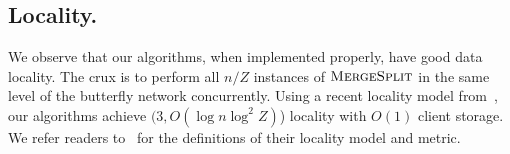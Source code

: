 \subsection{Locality.}
We observe that our algorithms, when implemented properly, have good data locality.
The crux is to perform all $n/Z$ instances of 
$\textsc{MergeSplit}$ in the same level of the butterfly network concurrently.
Using a recent locality model from~\cite{asharov2019locality},
our algorithms achieve $(3, O(\log n \log^2 Z)$) locality with $O(1)$ client storage.
We refer readers to~\cite{asharov2019locality} for the definitions of their locality model and metric.


